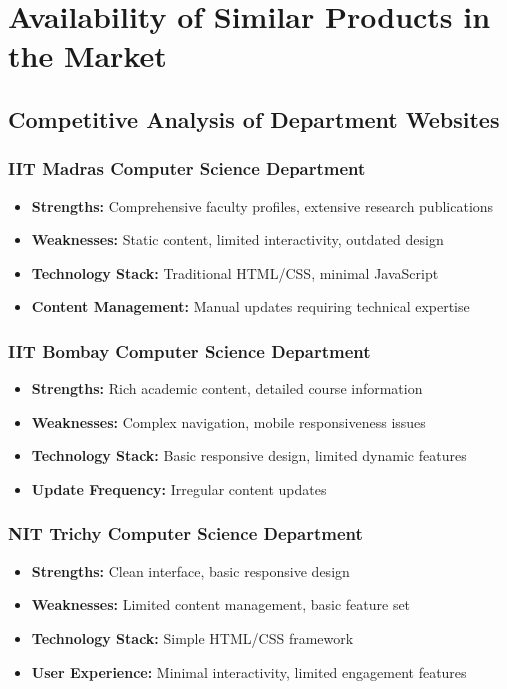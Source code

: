 \documentclass[12pt,a4paper]{report}
\begin{document}
\chapter{Availability of Similar Products in the Market}
\label{chap:market_analysis}

\section{Competitive Analysis of Department Websites}

\subsection{IIT Madras Computer Science Department}
\begin{itemize}
    \item \textbf{Strengths:} Comprehensive faculty profiles, extensive research publications
    \item \textbf{Weaknesses:} Static content, limited interactivity, outdated design
    \item \textbf{Technology Stack:} Traditional HTML/CSS, minimal JavaScript
    \item \textbf{Content Management:} Manual updates requiring technical expertise
\end{itemize}

\subsection{IIT Bombay Computer Science Department}
\begin{itemize}
    \item \textbf{Strengths:} Rich academic content, detailed course information
    \item \textbf{Weaknesses:} Complex navigation, mobile responsiveness issues
    \item \textbf{Technology Stack:} Basic responsive design, limited dynamic features
    \item \textbf{Update Frequency:} Irregular content updates
\end{itemize}

\subsection{NIT Trichy Computer Science Department}
\begin{itemize}
    \item \textbf{Strengths:} Clean interface, basic responsive design
    \item \textbf{Weaknesses:} Limited content management, basic feature set
    \item \textbf{Technology Stack:} Simple HTML/CSS framework
    \item \textbf{User Experience:} Minimal interactivity, limited engagement features
\end{itemize}
\end{document}
